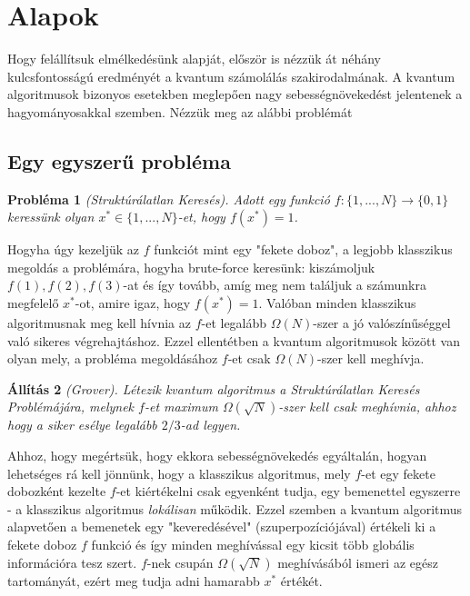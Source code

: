 \chapter{Alapok}\label{sect:Background}
\hspace{2mm} Hogy felállítsuk elmélkedésünk alapját, először is nézzük át néhány kulcsfontosságú eredményét a kvantum számolálás szakirodalmának.
A kvantum algoritmusok bizonyos esetekben meglepően nagy sebességnövekedést jelentenek a hagyományosakkal szemben. Nézzük meg az alábbi problémát

\section{Egy egyszerű probléma}
\vspace{2mm}
\textbf{Probléma 1} \textit{(Struktúrálatlan Keresés). Adott egy funkció $f:\{1,...,N\} \rightarrow \{0,1\}$ keressünk olyan $x^* \in \{1,...,N\}$-et, hogy $f(x^*)=1$.}
\vspace{2mm}

\indent Hogyha úgy kezeljük az $f$ funkciót mint egy "fekete doboz", a legjobb klasszikus megoldás a problémára, hogyha brute-force keresünk: kiszámoljuk $f(1),f(2),f(3)$-at és így tovább, amíg meg nem találjuk a számunkra megfelelő $x^*$-ot, amire igaz, hogy $f(x^*)= 1$.
Valóban minden klasszikus algoritmusnak meg kell hívnia az $f$-et legalább $\Omega(N)$-szer a jó valószínűséggel való sikeres végrehajtáshoz.
Ezzel ellentétben a kvantum algoritmusok között van olyan mely, a probléma megoldásához $f$-et csak $\Omega(N)$-szer kell meghívja.

\vspace{2mm}
\textbf{Állítás 2} \textit{(Grover). Létezik kvantum algoritmus a Struktúrálatlan Keresés Problémájára, melynek $f$-et maximum $\Omega(\sqrt{N})$-szer kell csak meghívnia, ahhoz hogy a siker esélye legalább $2/3$-ad legyen.}
\vspace{2mm}

\indent Ahhoz, hogy megértsük, hogy ekkora sebességnövekedés egyáltalán, hogyan lehetséges rá kell jönnünk, hogy a klasszikus algoritmus, mely $f$-et egy fekete dobozként kezelte $f$-et kiértékelni csak egyenként tudja, egy bemenettel egyszerre - a klasszikus algoritmus \textit{lokálisan} működik.
Ezzel szemben a kvantum algoritmus alapvetően a bemenetek egy "keveredésével" (szuperpozíciójával) értékeli ki a fekete doboz $f$ funkció és így minden meghívással egy kicsit több globális információra tesz szert.
$f$-nek csupán $\Omega(\sqrt{N})$ meghívásából ismeri az egész tartományát, ezért meg tudja adni hamarabb $x^*$ értékét.

